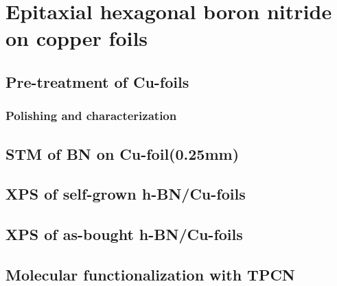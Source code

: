 \documentclass[
10pt,					%
a4paper,				%
twoside,				%
BCOR=8mm,				%
headings=normal,		%
headsepline,			%
footsepline,			%
plainfootsepline,		%
]{scrbook}
\begin{document}
\chapter{Epitaxial hexagonal boron nitride on copper foils}
  
\section{Pre-treatment of Cu-foils}
  \subsection{Polishing and characterization}
  	
%      
%      
  \section{STM of BN on Cu-foil(0.25mm)}
     
  \section{XPS of self-grown h-BN/Cu-foils}
     
  \section{XPS of as-bought h-BN/Cu-foils}
     
  \section{Molecular functionalization with TPCN}
     
%    
%    
\end{document}
